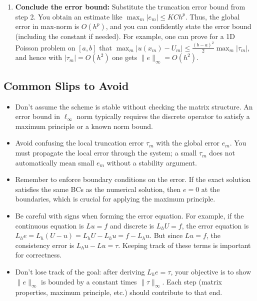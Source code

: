 \documentclass[a4paper,11pt]{article}
\begin{document}
\begin{enumerate}
    \item \textbf{Conclude the error bound:} Substitute the truncation error bound from step 2. You obtain an estimate like $\displaystyle \max_m |e_m| \leq KCh^p$. Thus, the global error in max-norm is $O(h^p)$, and you can confidently state the error bound (including the constant if needed). For example, one can prove for a 1D Poisson problem on $[a,b]$ that $\max_{m}|u(x_m)-U_m| \leq \frac{(b-a)^2}{2}\max_m|\tau_m|$, and hence with $|\tau_m|=O(h^2)$ one gets $\|e\|_\infty = O(h^2)$.
\end{enumerate}

\subsection{Common Slips to Avoid}

\begin{itemize}
    \item Don't assume the scheme is stable without checking the matrix structure. An error bound in $\ell_\infty$ norm typically requires the discrete operator to satisfy a maximum principle or a known norm bound.

    \item Avoid confusing the local truncation error $\tau_m$ with the global error $e_m$. You must propagate the local error through the system; a small $\tau_m$ does not automatically mean small $e_m$ without a stability argument.

    \item Remember to enforce boundary conditions on the error. If the exact solution satisfies the same BCs as the numerical solution, then $e=0$ at the boundaries, which is crucial for applying the maximum principle.

    \item Be careful with signs when forming the error equation. For example, if the continuous equation is $Lu=f$ and discrete is $L_h U = f$, the error equation is $L_h e = L_h(U - u) = L_h U - L_h u = f - L_h u$. But since $Lu=f$, the consistency error is $L_h u - Lu = \tau$. Keeping track of these terms is important for correctness.

    \item Don't lose track of the goal: after deriving $L_h e = \tau$, your objective is to show $\|e\|_\infty$ is bounded by a constant times $\|\tau\|_\infty$. Each step (matrix properties, maximum principle, etc.) should contribute to that end.
\end{itemize}
\end{document}
